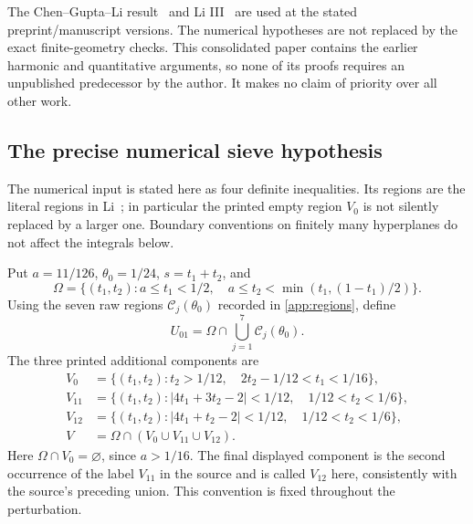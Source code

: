 The Chen--Gupta--Li result~\cite{CGL} and Li III~\cite{LiIII} are used at
the stated preprint/manuscript versions. The numerical hypotheses are
not replaced by the exact finite-geometry checks. This consolidated
paper contains the earlier harmonic and quantitative arguments, so
none of its proofs requires an unpublished predecessor by the author.
It makes no claim of priority over all other work.



\subsection{The precise numerical sieve hypothesis}
\label{sec:numerical-input}

The numerical input is stated here as four definite inequalities.
Its regions are the literal regions in Li~\cite[Section~7,
equations (15), (23), (24), and (26)]{LiIII}; in particular the
printed empty region $V_0$ is not silently replaced by a larger one.
Boundary conventions on finitely many hyperplanes do not affect the
integrals below.

Put $a=11/126$, $\theta_0=1/24$, $s=t_1+t_2$, and
\[
 \Omega=\{(t_1,t_2):a\le t_1<1/2,\quad
             a\le t_2<\min(t_1,(1-t_1)/2)\}.
\]
Using the seven raw regions $\mathcal C_j(\theta_0)$ recorded in
\cref{app:regions}, define
\[
 U_{01}=\Omega\cap\bigcup_{j=1}^7\mathcal C_j(\theta_0).
\]
The three printed additional components are
\begin{align*}
 V_0&=\{(t_1,t_2):t_2>1/12,\quad
                       2t_2-1/12<t_1<1/16\},\\
 V_{11}&=\{(t_1,t_2):|4t_1+3t_2-2|<1/12,\quad
                                  1/12<t_2<1/6\},\\
 V_{12}&=\{(t_1,t_2):|4t_1+t_2-2|<1/12,\quad
                                  1/12<t_2<1/6\},\\
 V&=\Omega\cap(V_0\cup V_{11}\cup V_{12}).
\end{align*}
Here $\Omega\cap V_0=\varnothing$, since $a>1/16$.
The final displayed component is the second occurrence of the label
$V_{11}$ in the source and is called $V_{12}$ here, consistently with
the source's preceding union. This convention is fixed throughout
the perturbation.

